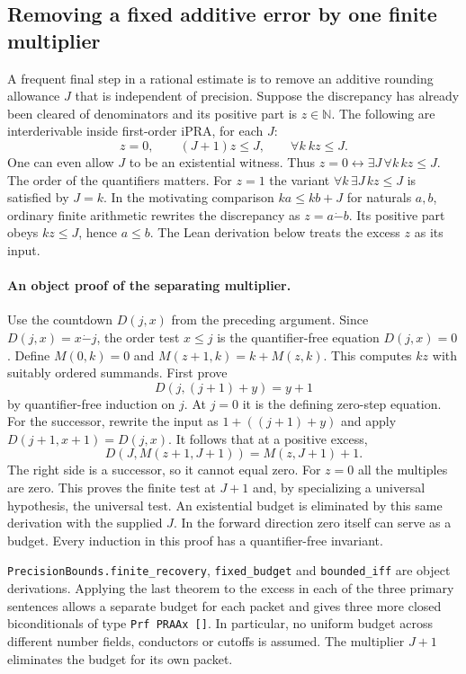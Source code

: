 \subsection{Removing a fixed additive error by one finite multiplier}

A frequent final step in a rational estimate is to remove an additive
rounding allowance $J$ that is independent of precision. Suppose the
discrepancy has already been cleared of denominators and its positive part
is $z\in\mathbb N$. The following are interderivable inside first-order
iPRA, for each $J$:
\[
 z=0,\qquad (J+1)z\le J,\qquad
                 \forall k\ k z\le J .
\]
One can even allow $J$ to be an existential witness. Thus
$z=0\leftrightarrow\exists J\,\forall k\,kz\le J$. The order of the
quantifiers matters. For $z=1$ the variant
$\forall k\,\exists J\,kz\le J$ is satisfied by $J=k$.
In the motivating comparison $ka\le kb+J$ for naturals $a,b$,
ordinary finite arithmetic rewrites the discrepancy as
$z=a\mathbin{\dot-} b$. Its positive part obeys $kz\le J$, hence $a\le b$.
The Lean derivation below treats the excess $z$ as its input.

\paragraph{An object proof of the separating multiplier.}
Use the countdown $D(j,x)$ from the preceding argument. Since
$D(j,x)=x\mathbin{\dot-}j$, the order test $x\le j$ is the quantifier-free
equation $D(j,x)=0$. Define $M(0,k)=0$ and
$M(z+1,k)=k+M(z,k)$. This computes $kz$ with suitably ordered summands.
First prove
\[
              D(j,(j+1)+y)=y+1
\]
by quantifier-free induction on $j$. At $j=0$ it is the defining
zero-step equation. For the successor, rewrite the input as
$1+((j+1)+y)$ and apply $D(j+1,x+1)=D(j,x)$.
It follows that at a positive excess,
\[
           D(J,M(z+1,J+1))=M(z,J+1)+1.
\]
The right side is a successor, so it cannot equal zero. For $z=0$ all
the multiples are zero. This proves the finite test at $J+1$ and, by
specializing a universal hypothesis, the universal test. An existential
budget is eliminated by this same derivation with the supplied $J$.
In the forward direction zero itself can serve as a budget.
Every induction in this proof has a quantifier-free invariant.

\texttt{PrecisionBounds.finite\_recovery},
\texttt{fixed\_budget} and \texttt{bounded\_iff} are object derivations.
Applying the last theorem to the excess in each of the three primary
sentences allows a separate budget for each packet and gives three more
closed biconditionals of type \texttt{Prf PRAAx []}. In particular,
no uniform budget across different number fields, conductors or cutoffs
is assumed. The multiplier $J+1$ eliminates the budget for its own packet.
